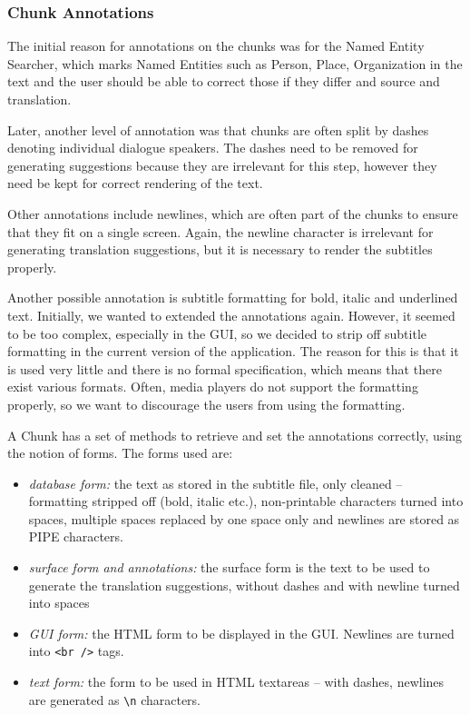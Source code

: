 \subsubsection{Chunk Annotations}

The initial reason for annotations on the chunks was for the Named Entity Searcher, which marks Named Entities such as Person, Place, Organization in the text and the user should be able to correct those if they differ and source and translation.

Later, another level of annotation was that chunks are often split by dashes denoting individual dialogue speakers. The dashes need to be removed for generating suggestions because they are irrelevant for this step, however they need be kept for correct rendering of the text.

Other annotations include newlines, which are often part of the chunks to ensure that they fit on a single screen. Again, the newline character is irrelevant for generating translation suggestions, but it is necessary to render the subtitles properly.

Another possible annotation is subtitle formatting for bold, italic and underlined text. Initially, we wanted to extended the annotations again. However, it seemed to be too complex, especially in the GUI, so we decided to strip off subtitle formatting in the current version of the application. The reason for this is that it is used very little and there is no formal specification, which means that there exist various formats. Often, media players do not support the formatting properly, so we want to discourage the users from using the formatting.

A Chunk has a set of methods to retrieve and set the annotations correctly, using the notion of forms. The forms used are:

\begin{itemize}
	\item \emph{database form:} the text as stored in the subtitle file, only cleaned -- formatting stripped off (bold, italic etc.), non-printable characters turned into spaces, multiple spaces replaced by one space only and newlines are stored as PIPE characters.
	\item \emph{surface form and annotations:} the surface form is the text to be used to generate the translation suggestions, without dashes and with newline turned into spaces
	\item \emph{GUI form:} the HTML form to be displayed in the GUI. Newlines are turned into {\tt <br />} tags.
	\item \emph{text form:} the form to be used in HTML textareas -- with dashes, newlines are generated as {\tt \verb#\n#} characters.
\end{itemize}


